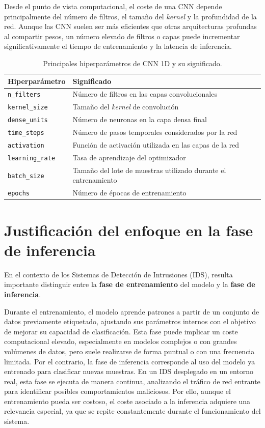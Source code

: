 Desde el punto de vista computacional, el coste de una CNN depende principalmente del número de filtros, el tamaño del \textit{kernel} y la profundidad de la red. Aunque las CNN suelen ser más eficientes que otras arquitecturas profundas al compartir pesos, un número elevado de filtros o capas puede incrementar significativamente el tiempo de entrenamiento y la latencia de inferencia.

\begin{table}[H]
    \centering
    \caption{Principales hiperparámetros de CNN 1D y su significado.}
    \label{tab:cnn_hyperparams}
    \begin{tabular}{ll}
        \toprule
        \textbf{Hiperparámetro} & \textbf{Significado} \\
        \midrule
        \texttt{n\_filters} & Número de filtros en las capas convolucionales \\
        \texttt{kernel\_size} & Tamaño del \textit{kernel} de convolución \\
        \texttt{dense\_units} & Número de neuronas en la capa densa final \\
        \texttt{time\_steps} & Número de pasos temporales considerados por la red \\
        \texttt{activation} & Función de activación utilizada en las capas de la red \\
        \texttt{learning\_rate} & Tasa de aprendizaje del optimizador \\
        \texttt{batch\_size} & Tamaño del lote de muestras utilizado durante el entrenamiento \\
        \texttt{epochs} & Número de épocas de entrenamiento \\
        \bottomrule
    \end{tabular}
\end{table}

\section{Justificación del enfoque en la fase de inferencia}


En el contexto de los Sistemas de Detección de Intrusiones (IDS), resulta importante distinguir entre la \textbf{fase de entrenamiento} del modelo y la \textbf{fase de inferencia}. 

Durante el entrenamiento, el modelo aprende patrones a partir de un conjunto de datos previamente etiquetado, ajustando sus parámetros internos con el objetivo de mejorar su capacidad de clasificación. Esta fase puede implicar un coste computacional elevado, especialmente en modelos complejos o con grandes volúmenes de datos, pero suele realizarse de forma puntual o con una frecuencia limitada.
Por el contrario, la fase de inferencia corresponde al uso del modelo ya entrenado para clasificar nuevas muestras. En un IDS desplegado en un entorno real, esta fase se ejecuta de manera continua, analizando el tráfico de red entrante para identificar posibles comportamientos maliciosos. Por ello, aunque el entrenamiento pueda ser costoso, el coste asociado a la inferencia adquiere una relevancia especial, ya que se repite constantemente durante el funcionamiento del sistema.

